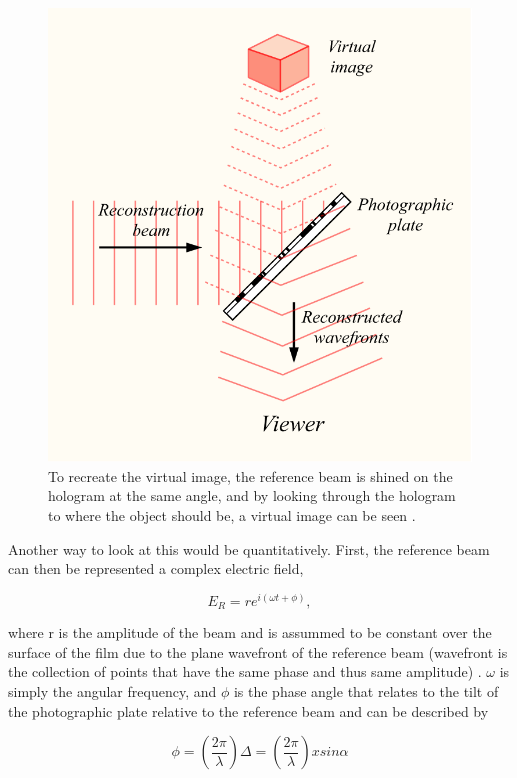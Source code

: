 \documentclass[ notitlepage, numerical, 11pt]{revtex4-1} %
\begin{document}
\begin{figure}[H]
\centerline{\includegraphics[scale=.45]{reconstruct.png}}
\caption{To recreate the virtual image, the reference beam is shined on the hologram at the same angle, and by looking through the hologram to where the object should be, a virtual image can be seen \cite{HDS}.}
\label{reconstruct}
\end{figure} 

Another way to look at this would be quantitatively. First, the reference beam can then be represented a complex electric field,

\begin{equation}
E_{R} = re^{i(\omega t + \phi)},
\label{eRef}
\end{equation}

where r is the amplitude of the beam and is assummed to be constant over the surface of the film due to the plane wavefront of the reference beam (wavefront is the collection of points that have the same phase and thus same amplitude) \cite{optics}. $\omega$ is simply the angular frequency, and $\phi$ is the phase angle that relates to the tilt of the photographic plate relative to the reference beam and can be described by

\begin{equation}
\phi = (\frac{2\pi}{\lambda})\Delta = (\frac{2\pi}{\lambda})x sin \alpha
\label{phi}
\end{equation}
\end{document}
